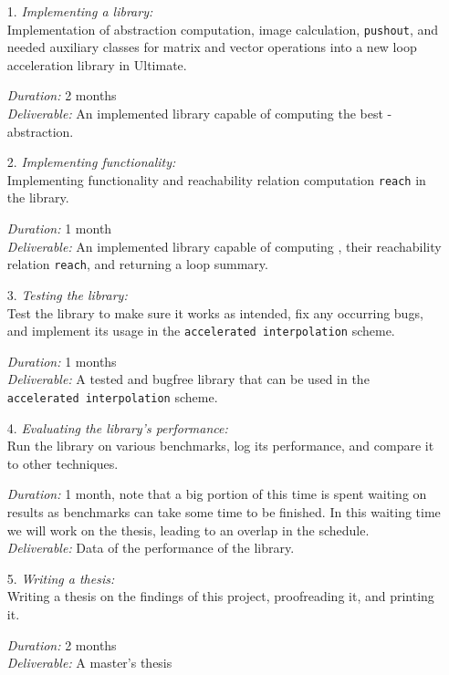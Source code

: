 \begin{itemize}
	\item[1.] \textsl{Implementing a \qvasr library:} \\
               Implementation of \qvasr abstraction computation, \qvasr image calculation, \texttt{pushout}, and needed auxiliary classes for matrix and vector operations into a new loop acceleration library in Ultimate.

			  \textsl{Duration:} 2 months \\
			  \textsl{Deliverable:} An implemented library capable of computing the best \qvasr-abstraction.

	\item[2.] \textsl{Implementing \qvasrs functionality:} \\
               Implementing \qvasrs functionality and reachability relation computation \texttt{reach} in the \qvasr library.

			  \textsl{Duration:} 1 month \\
			  \textsl{Deliverable:} An implemented library capable of computing \qvasrs, their reachability relation \texttt{reach}, and returning a loop summary.

	\item[3.] \textsl{Testing the library:} \\
               Test the library to make sure it works as intended, fix any occurring bugs, and implement its usage in the \texttt{accelerated interpolation} scheme.

			  \textsl{Duration:} 1 months \\
			  \textsl{Deliverable:} A tested and bugfree \qvasr library that can be used in the \\ \texttt{accelerated interpolation} scheme.

	\item[4.] \textsl{Evaluating the library's performance:} \\
               Run the library on various benchmarks, log its performance, and compare it to other techniques.

			  \textsl{Duration:} 1 month, note that a big portion of this time is spent waiting on results as benchmarks can take some time to be finished. In this waiting time we will work on the thesis, leading to an overlap in the schedule.\\
			  \textsl{Deliverable:} Data of the performance of the \qvasr library.

	\item[5.] \textsl{Writing a thesis:} \\
              Writing a thesis on the findings of this project, proofreading it, and printing it.

			  \textsl{Duration:} 2 months \\
			  \textsl{Deliverable:}	A master's thesis
\end{itemize}
